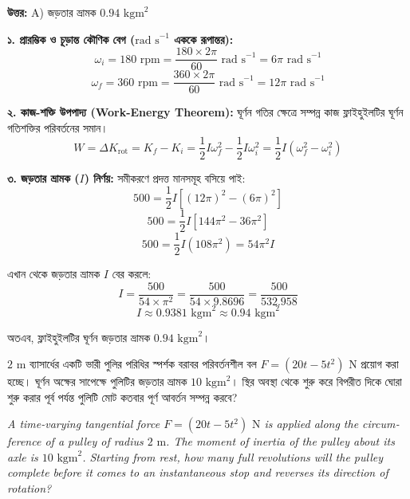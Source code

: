 \documentclass[12pt, a4paper]{article}
\begin{document}
\vspace{0.5em}
\begin{tcolorbox}[answerbox]
\textbf{\color{success} উত্তর:} A) জড়তার ভ্রামক $0.94\text{ kgm}^2$
\end{tcolorbox}
\vspace{1em}

\begin{tcolorbox}[solutionbox={সমাধান (Solution)}]
\noindent
\textbf{১. প্রারম্ভিক ও চূড়ান্ত কৌণিক বেগ ($\text{rad s}^{-1}$ এককে রূপান্তর):}
$$\omega_i = 180\text{ rpm} = \frac{180 \times 2\pi}{60}\text{ rad s}^{-1} = 6\pi\text{ rad s}^{-1}$$
$$\omega_f = 360\text{ rpm} = \frac{360 \times 2\pi}{60}\text{ rad s}^{-1} = 12\pi\text{ rad s}^{-1}$$

\vspace{0.5em}
\textbf{২. কাজ-শক্তি উপপাদ্য (Work-Energy Theorem):}
ঘূর্ণন গতির ক্ষেত্রে সম্পন্ন কাজ ফ্লাইহুইলটির ঘূর্ণন গতিশক্তির পরিবর্তনের সমান। 
$$W = \Delta K_{\text{rot}} = K_f - K_i = \frac{1}{2} I \omega_f^2 - \frac{1}{2} I \omega_i^2 = \frac{1}{2} I (\omega_f^2 - \omega_i^2)$$

\vspace{0.5em}
\textbf{৩. জড়তার ভ্রামক ($I$) নির্ণয়:}
সমীকরণে প্রদত্ত মানসমূহ বসিয়ে পাই:
$$500 = \frac{1}{2} I \left[ (12\pi)^2 - (6\pi)^2 \right]$$
$$500 = \frac{1}{2} I \left[ 144\pi^2 - 36\pi^2 \right]$$
$$500 = \frac{1}{2} I (108\pi^2) = 54\pi^2 I$$

এখান থেকে জড়তার ভ্রামক $I$ বের করলে:
$$I = \frac{500}{54 \times \pi^2} = \frac{500}{54 \times 9.8696} = \frac{500}{532.958}$$
$$I \approx 0.9381\text{ kgm}^2 \approx 0.94\text{ kgm}^2$$

অতএব, ফ্লাইহুইলটির ঘূর্ণন জড়তার ভ্রামক $0.94\text{ kgm}^2$।
\end{tcolorbox}
\vspace{1em}


\begin{tcolorbox}[questionbox={প্রশ্ন (Question) 28}]
\noindent
$2\text{ m}$ ব্যাসার্ধের একটি ভারী পুলির পরিধির স্পর্শক বরাবর পরিবর্তনশীল বল $F = (20t - 5t^2)\text{ N}$ প্রয়োগ করা হচ্ছে। ঘূর্ণন অক্ষের সাপেক্ষে পুলিটির জড়তার ভ্রামক $10\text{ kgm}^2$। স্থির অবস্থা থেকে শুরু করে বিপরীত দিকে ঘোরা শুরু করার পূর্ব পর্যন্ত পুলিটি মোট কতবার পূর্ণ আবর্তন সম্পন্ন করবে?

\vspace{0.8em}
\begin{english}
\noindent\textit{\color{darkgray}
A time-varying tangential force $F = (20t - 5t^2)\text{ N}$ is applied along the circumference of a pulley of radius $2\text{ m}$. The moment of inertia of the pulley about its axle is $10\text{ kgm}^2$. Starting from rest, how many full revolutions will the pulley complete before it comes to an instantaneous stop and reverses its direction of rotation?
}
\end{english}
\end{tcolorbox}
\end{document}

